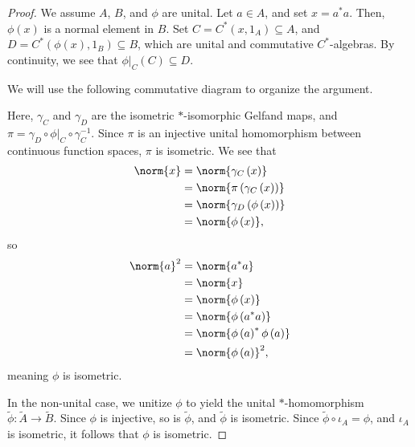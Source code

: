\documentclass[10pt]{mypackage}
\begin{document}
\begin{proof}
  We assume $A$, $B$, and $\phi$ are unital. Let $a\in A$, and set $x = a^{\ast}a$. Then, $\phi(x)$ is a normal element in $B$. Set $C = C^{\ast}\left(x,1_A\right)\subseteq A$, and $D = C^{\ast}\left(\phi(x),1_B\right)\subseteq B$, which are unital and commutative $C^{\ast}$-algebras. By continuity, we see that $\phi|_{C}\left(C\right)\subseteq D$.\newline

  We will use the following commutative diagram to organize the argument.
  \begin{center}
  \end{center}
  Here, $\gamma_C$ and $\gamma_D$ are the isometric $\ast$-isomorphic Gelfand maps, and $\pi = \gamma_D\circ \phi|_{C}\circ \gamma_C^{-1}$. Since $\pi$ is an injective unital homomorphism between continuous function spaces, $\pi$ is isometric. We see that
  \begin{align*}
    \norm{x} &= \norm{\gamma_C\left(x\right)}\\
             &= \norm{\pi\left(\gamma_C\left(x\right)\right)}\\
             &= \norm{\gamma_D\left(\phi\left(x\right)\right)}\\
             &= \norm{\phi\left(x\right)},
  \end{align*}
  so
  \begin{align*}
    \norm{a}^2 &= \norm{a^{\ast}a}\\
               &= \norm{x}\\
               &= \norm{\phi\left(x\right)}\\
               &= \norm{\phi\left(a^{\ast}a\right)}\\
               &= \norm{\phi\left(a\right)^{\ast}\phi\left(a\right)}\\
               &= \norm{\phi\left(a\right)}^2,
  \end{align*}
  meaning $\phi$ is isometric.\newline

  In the non-unital case, we unitize $\phi$ to yield the unital $\ast$-homomorphism $\widetilde{\phi}\colon \widetilde{A}\rightarrow \widetilde{B}$. Since $\phi$ is injective, so is $\widetilde{\phi}$, and $\widetilde{\phi}$ is isometric. Since $\widetilde{\phi}\circ \iota_A = \phi$, and $\iota_A$ is isometric, it follows that $\phi$ is isometric.
\end{proof}
\end{document}
